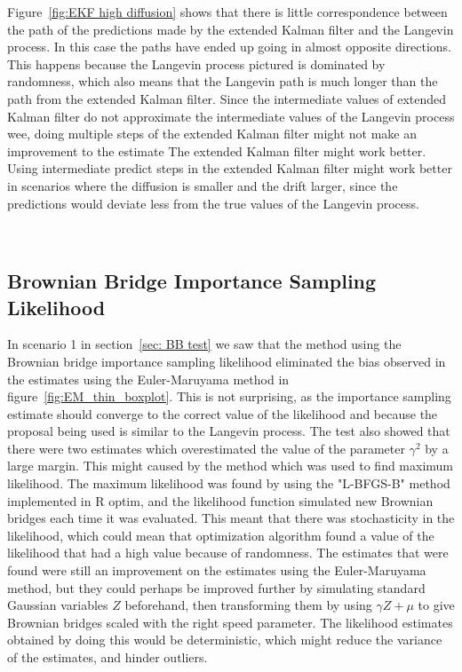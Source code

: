 Figure~\ref{fig:EKF high diffusion} shows that there is little correspondence between the path of the predictions made by the extended Kalman filter and the Langevin process. In this case the paths have ended up going in almost opposite directions. This happens because the Langevin process pictured is dominated by randomness, which also means that the Langevin path is much longer than the path from the extended Kalman filter. Since the intermediate values of extended Kalman filter do not approximate the intermediate values of the Langevin process wee, doing multiple steps of the extended Kalman filter might not make an improvement to the estimate
The extended Kalman filter might work better. Using intermediate predict steps in the extended Kalman filter might work better in scenarios where the diffusion is smaller and the drift larger, since the predictions would deviate less from the true values of the Langevin process.

\


\subsection{Brownian Bridge Importance Sampling Likelihood}
\label{subsec: brownian bridge interpretation}
In scenario 1 in section~\ref{sec: BB test} we saw that the method using the Brownian bridge importance sampling likelihood eliminated the bias observed in the estimates using the Euler-Maruyama method in figure~\ref{fig:EM_thin_boxplot}. This is not surprising, as the importance sampling estimate should converge to the correct value of the likelihood and because the proposal being used is similar to the Langevin process. The test also showed that there were two estimates which overestimated the value of the parameter $\gamma^2$ by a large margin. This might caused by the method which was used to find maximum likelihood. The maximum likelihood was found by using the "L-BFGS-B" method implemented in R optim, and the likelihood function simulated new Brownian bridges each time it was evaluated. This meant that there was stochasticity in the likelihood, which could mean that optimization algorithm found a value of the likelihood that had a high value because of randomness. The estimates that were found were still an improvement on the estimates using the Euler-Maruyama method, but they could perhaps be improved further by simulating standard Gaussian variables $Z$ beforehand, then transforming them by using $\gamma Z +\mu$ to give Brownian bridges scaled with the right speed parameter. The likelihood estimates obtained by doing this would be deterministic, which might reduce the variance of the estimates, and hinder outliers.


